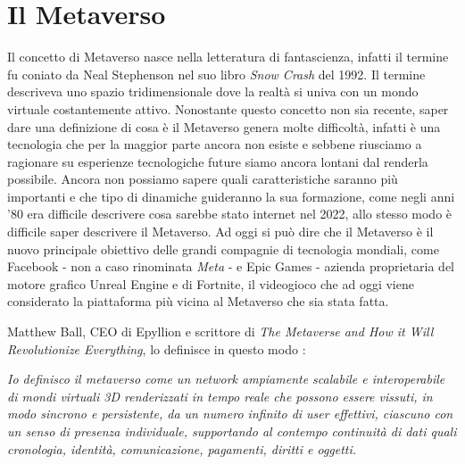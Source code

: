 


\section{Il Metaverso}

    Il concetto di Metaverso nasce nella letteratura di fantascienza, infatti il termine fu coniato da Neal Stephenson nel suo libro \textit{Snow Crash} del 1992. 
    Il termine descriveva uno spazio tridimensionale dove la realtà si univa con un mondo virtuale costantemente attivo.
    Nonostante questo concetto non sia recente, saper dare una definizione di cosa è il Metaverso genera molte difficoltà, infatti è una tecnologia che per la maggior parte ancora non esiste e sebbene riusciamo a ragionare su esperienze tecnologiche future siamo ancora lontani dal renderla possibile.
    Ancora non possiamo sapere quali caratteristiche saranno più importanti e che tipo di dinamiche guideranno la sua formazione, come negli anni '80 era difficile descrivere cosa sarebbe stato internet nel 2022, allo stesso modo è difficile saper descrivere il Metaverso.
    Ad oggi si può dire che il Metaverso è il nuovo principale obiettivo delle grandi compagnie di tecnologia mondiali, come Facebook - non a caso rinominata \textit{Meta} - e Epic Games - azienda proprietaria del motore grafico Unreal Engine e di Fortnite, il videogioco che ad oggi viene considerato la piattaforma più vicina al Metaverso che sia stata fatta.

    Matthew Ball, CEO di Epyllion e scrittore di \textit{The Metaverse and How it Will Revolutionize Everything}, lo definisce in questo modo \cite{Ball2022}: 

    \begin{displayquote}
        \textit{Io definisco il metaverso come un network ampiamente scalabile e interoperabile di mondi virtuali 3D renderizzati in tempo reale che possono essere vissuti, in modo sincrono e persistente, da un numero infinito di user effettivi, ciascuno con un senso di presenza individuale, supportando al contempo continuità di dati quali cronologia, identità, comunicazione, pagamenti, diritti e oggetti.}
    \end{displayquote}

